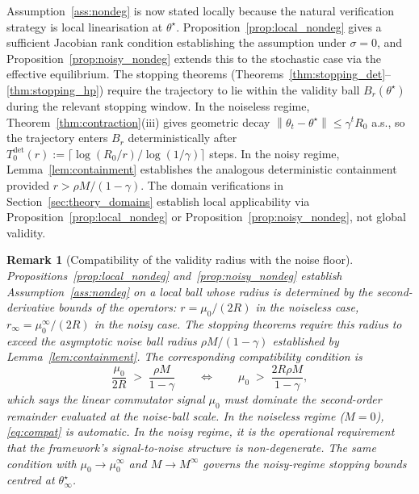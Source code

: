 \documentclass[12pt,a4paper]{article}
\newtheorem{remark}[definition]{Remark}
\newcommand{\norm}[1]{\left\lVert#1\right\rVert}
\begin{document}
Assumption~\ref{ass:nondeg} is now stated locally because the natural
verification strategy is local linearisation at $\theta^\star$.
Proposition~\ref{prop:local_nondeg} gives a sufficient Jacobian rank
condition establishing the assumption under $\sigma = 0$, and
Proposition~\ref{prop:noisy_nondeg} extends this to the stochastic case via
the effective equilibrium. The stopping theorems
(Theorems~\ref{thm:stopping_det}--\ref{thm:stopping_hp}) require the
trajectory to lie within the validity ball $B_r(\theta^\star)$ during the
relevant stopping window. In the noiseless regime,
Theorem~\ref{thm:contraction}(iii) gives geometric decay
$\norm{\theta_t - \theta^\star} \leq \gamma^t R_0$ a.s., so the trajectory
enters $B_r$ deterministically after
$T_0^{\mathrm{det}}(r) := \lceil \log(R_0/r)/\log(1/\gamma) \rceil$ steps. In
the noisy regime, Lemma~\ref{lem:containment} establishes the analogous
deterministic containment provided $r > \rho M/(1-\gamma)$. The domain
verifications in Section~\ref{sec:theory_domains} establish local
applicability via Proposition~\ref{prop:local_nondeg} or
Proposition~\ref{prop:noisy_nondeg}, not global validity.

\begin{remark}[Compatibility of the validity radius with the noise floor]
\label{rem:radius_compat}
Propositions~\ref{prop:local_nondeg} and~\ref{prop:noisy_nondeg} establish
Assumption~\ref{ass:nondeg} on a local ball whose radius is determined by
the second-derivative bounds of the operators: $r = \mu_0/(2R)$ in the
noiseless case, $r_\infty = \mu_0^\infty/(2R)$ in the noisy case. The
stopping theorems require this radius to exceed the asymptotic noise ball
radius $\rho M/(1-\gamma)$ established by
Lemma~\ref{lem:containment}. The corresponding compatibility condition is
\begin{equation}
\label{eq:compat}
  \frac{\mu_0}{2R} \;>\; \frac{\rho M}{1-\gamma}
  \qquad\Longleftrightarrow\qquad
  \mu_0 \;>\; \frac{2R \rho M}{1-\gamma},
\end{equation}
which says the linear commutator signal $\mu_0$ must dominate the
second-order remainder evaluated at the noise-ball scale. In the noiseless
regime ($M = 0$), \eqref{eq:compat} is automatic. In the noisy regime, it
is the operational requirement that the framework's signal-to-noise
structure is non-degenerate. The same condition with $\mu_0 \to \mu_0^\infty$
and $M \to M^\infty$ governs the noisy-regime stopping bounds centred at
$\theta^\star_\infty$.
\end{remark}
\end{document}
